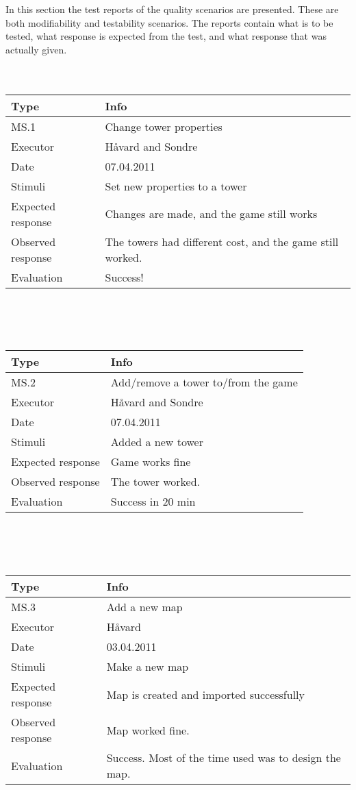 In this section the test reports of the quality scenarios are presented. These are both modifiability and testability scenarios. The reports contain what is to be tested, what response is expected from the test, and what response that was actually given.
\\
\\
\\
\begin{tabular}{|l | p{8.7cm} |}
	\hline	
	\textbf{Type} & \textbf{Info} \\
	\hline
	MS.1 & Change tower properties \\
	\hline
	Executor & Håvard and Sondre \\
	\hline
	Date & 07.04.2011 \\
	\hline
	Stimuli & Set new properties to a tower \\
	\hline
	Expected response & Changes are made, and the game still works\\
	\hline
	Observed response & The towers had different cost, and the game still worked.\\
	\hline
	Evaluation & Success! \\
	\hline
  \end{tabular}
  \\
  \\
  \\
  \begin{tabular}{|l | p{8.7cm} |}
	\hline	
	\textbf{Type} & \textbf{Info} \\
	\hline
	MS.2 & Add/remove a tower to/from the game \\
	\hline
	Executor & Håvard and Sondre \\
	\hline
	Date & 07.04.2011 \\
	\hline
	Stimuli & Added a new tower \\
	\hline
	Expected response & Game works fine\\
	\hline
	Observed response & The tower worked.\\
	\hline
	Evaluation & Success in 20 min \\
	\hline
  \end{tabular}
  \\
  \\
  \\
  \begin{tabular}{|l | p{8.7cm} |}
	\hline	
	\textbf{Type} & \textbf{Info} \\
	\hline
	MS.3 & Add a new map\\
	\hline
	Executor & Håvard\\
	\hline
	Date & 03.04.2011 \\
	\hline
	Stimuli & Make a new map \\
	\hline
	Expected response & Map is created and imported successfully\\
	\hline
	Observed response & Map worked fine.\\
	\hline
	Evaluation & Success. Most of the time used was to design the map. \\
	\hline
  \end{tabular}

